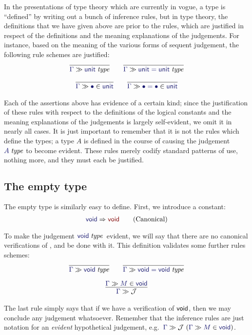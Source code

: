 \documentclass[main.tex]{subfiles}
\begin{document}
In the presentations of type theory which are currently in vogue, a type is
``defined'' by writing out a bunch of inference rules, but in type theory, the
definitions that we have given above are prior to the rules, which are
justified in respect of the definitions and the meaning explanations of the
judgements. For instance, based on the meaning of the various forms of sequent
judgement, the following rule schemes are justified:
\begin{gather*}
  \infer{
    \sequent\Gamma\isset\tyunit
  }{
  }\qquad
  \infer{
    \sequent\Gamma\isset{\tyunit=\tyunit}
  }{
  }\\[6pt]
  \infer{
    \sequent\Gamma\ver\bullet\tyunit
  }{
  }\qquad
  \infer{
    \sequent\Gamma\ver{\bullet=\bullet}{\tyunit}
  }{
  }
\end{gather*}

Each of the assertions above has evidence of a certain kind; since the
justification of these rules with respect to the definitions of the logical
constants and the meaning explanations of the judgements is largely
self-evident, we omit it in nearly all cases. It is just important to remember
that it is not the rules which define the types; a type $A$ is defined in the
course of causing the judgement $\isset{A}$ to become evident.  These rules
merely codify standard patterns of use, nothing more, and they must each be
justified.

\subsection{The empty type}

The empty type is similarly easy to define. First, we introduce a constant:
\begin{gather*}
  \reduce\tyvoid\tyvoid\tag{Canonical}
\end{gather*}

To make the judgement $\isset\tyvoid$\ evident, we will say that there are no
canonical verifications of \tyvoid, and be done with it. This definition
validates some further rules schemes:
\begin{gather*}
  \infer{
    \sequent\Gamma\isset\tyvoid
  }{
  }\qquad
  \infer{
    \sequent\Gamma\isset{\tyvoid=\tyvoid}
  }{
  }\\[6pt]
  \infer{
    \sequent\Gamma\mathcal{J}
  }{
    \sequent\Gamma\ver{M}{\tyvoid}
  }
\end{gather*}

The last rule simply says that if we have a verification of $\mathsf{void}$, then we
may conclude any judgement whatsoever. Remember that the inference rules are
just notation for an \emph{evident} hypothetical judgement, e.g.\
$\hyp{\sequent{\Gamma}\mathcal{J}}{\sequent\Gamma\ver{M}{\tyvoid}}$.
\end{document}
